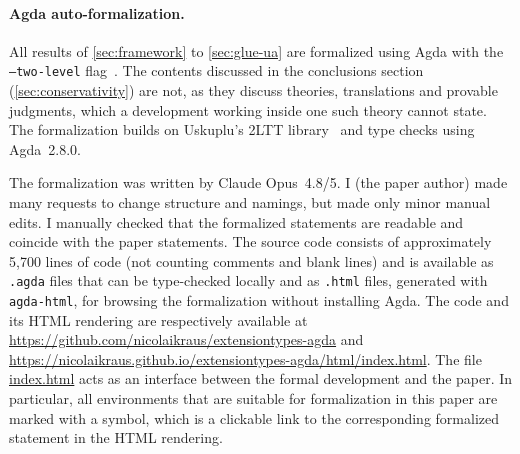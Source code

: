 \paragraph{Agda auto-formalization.}

All results of \cref{sec:framework} to \cref{sec:glue-ua} are formalized using Agda with the \texttt{--two-level} flag~\citep{agdareadthedocs}.
The contents discussed in the conclusions section (\cref{sec:conservativity}) are not, as they discuss theories, translations and provable judgments, which a development working inside one such theory cannot state.
%
The formalization builds on Uskuplu's 2LTT library~\citep{2LTTAgda,Uskuplu2025} and type checks using
Agda~2.8.0.

The formalization was written by Claude Opus~4.8/5.
I (the paper author) made many requests to change structure and namings, but made only minor manual edits.
I manually checked that the formalized statements are readable and coincide with the paper statements.
%
The source code consists of approximately 5,700 lines of code (not counting comments and blank lines) and is available as \texttt{.agda} files that can be type-checked locally and as \texttt{.html} files, generated with \texttt{agda-html}, for browsing the formalization without installing Agda.
%
The code and its HTML rendering are respectively available at
\url{https://github.com/nicolaikraus/extensiontypes-agda} and
\url{https://nicolaikraus.github.io/extensiontypes-agda/html/index.html}.
%
The file \href{\agdabaseurl}{index.html} acts as an interface between the formal development
and the paper. In particular, all environments that are suitable for formalization in this paper are marked
with a \formalized{} symbol, which is a clickable link to the corresponding
formalized statement in the HTML rendering.


